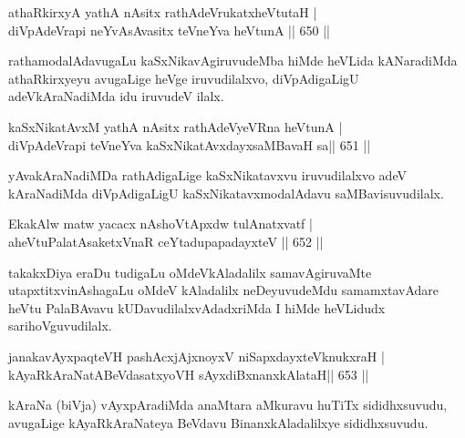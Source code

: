 
\begin{shl}
athaRkirxyA yathA nAsitx rathAdeVrukatxheVtutaH | \\
diVpAdeVrapi neYvAsAvasitx teVneYva heVtunA \hfill||  650 ||  
\end{shl}

\begin{artha}
rathamodalAdavugaLu kaSxNikavAgiruvudeMba hiMde heVLida kANaradiMda athaRkirxyeyu avugaLige heVge iruvudilalxvo, diVpAdigaLigU adeVkAraNadiMda idu iruvudeV ilalx.
\end{artha}

\begin{shl}
kaSxNikatAvxM yathA nAsitx rathAdeVyeVRna heVtunA | \\
diVpAdeVrapi teVneYva kaSxNikatAvxdayxsaMBavaH sa\hfill ||  651 ||  
\end{shl}

\begin{artha}
yAvakAraNadiMDa rathAdigaLige kaSxNikatavxvu iruvudilalxvo adeV kAraNadiMda diVpAdigaLigU kaSxNikatavxmodalAdavu saMBavisuvudilalx.
\end{artha}

\begin{shl}
EkakAlw matw yacacx nAshoVtApxdw tulAnatxvatf | \\
aheVtuPalatAsaketxVnaR ceYtadupapadayxteV \hfill||  652 ||  
\end{shl}

\begin{artha}
takakxDiya eraDu tudigaLu oMdeVkAladalilx samavAgiruvaMte utapxtitxvinAshagaLu oMdeV kAladalilx neDeyuvudeMdu samamxtavAdare heVtu PalaBAvavu kUDavudilalxvAdadxriMda I hiMde heVLidudx sarihoVguvudilalx.
\end{artha}


\begin{shl}
janakavAyxpaqteVH pashAcxjAjxnoyxV niSapxdayxteV\s knukxraH | \\
kAyaRkAraNatABeVdasatxyoVH sAyxdiBxnanxkAlataH\hfill ||  653 ||  
\end{shl}

\begin{artha}
kAraNa (biVja) vAyxpAradiMda anaMtara aMkuravu huTiTx sididhxsuvudu, avugaLige kAyaRkAraNateya BeVdavu BinanxkAladalilxye sididhxsuvudu.
\end{artha}

